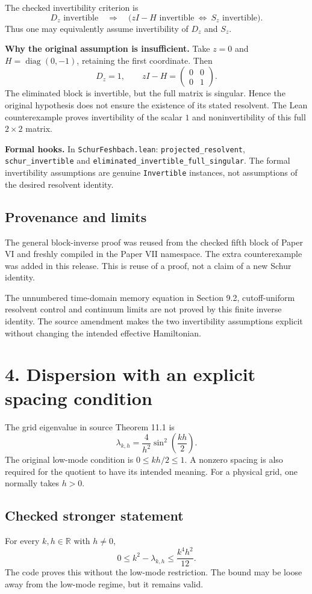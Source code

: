 \documentclass[11pt]{article}
\newcommand{\R}{\mathbb R}
\newcommand{\diag}{\operatorname{diag}}
\newcommand{\code}[1]{{\small\nolinkurl{#1}}}
\begin{document}
The checked invertibility criterion is
\[
D_z\text{ invertible}\quad\Longrightarrow\quad
\bigl(zI-H\text{ invertible}\ \Longleftrightarrow\ S_z\text{ invertible}\bigr).
\]
Thus one may equivalently assume invertibility of $D_z$ and $S_z$.

\textbf{Why the original assumption is insufficient.}
Take $z=0$ and $H=\diag(0,-1)$, retaining the first coordinate. Then
\[
D_z=1,\qquad zI-H=\begin{pmatrix}0&0\\0&1\end{pmatrix}.
\]
The eliminated block is invertible, but the full matrix is singular. Hence the original hypothesis does not ensure the existence of its stated resolvent. The Lean counterexample proves invertibility of the scalar $1$ and noninvertibility of this full $2\times2$ matrix.

\textbf{Formal hooks.} In \code{SchurFeshbach.lean}:
\code{projected_resolvent}, \code{schur_invertible} and
\code{eliminated_invertible_full_singular}.
The formal invertibility assumptions are genuine \code{Invertible} instances, not assumptions of the desired resolvent identity.

\subsection*{Provenance and limits}
The general block-inverse proof was reused from the checked fifth block of Paper VI and freshly compiled in the Paper VII namespace. The extra counterexample was added in this release. This is reuse of a proof, not a claim of a new Schur identity.

The unnumbered time-domain memory equation in Section 9.2, cutoff-uniform resolvent control and continuum limits are not proved by this finite inverse identity. The source amendment makes the two invertibility assumptions explicit without changing the intended effective Hamiltonian.

\clearpage
\section*{4. Dispersion with an explicit spacing condition}
The grid eigenvalue in source Theorem 11.1 is
\[
\lambda_{k,h}=\frac{4}{h^2}\sin^2\left(\frac{kh}{2}\right).
\]
The original low-mode condition is $0\le kh/2\le1$. A nonzero spacing is also required for the quotient to have its intended meaning. For a physical grid, one normally takes $h>0$.

\subsection*{Checked stronger statement}
For every $k,h\in\R$ with $h\ne0$,
\[
\boxed{0\le k^2-\lambda_{k,h}\le\frac{k^4h^2}{12}.}
\]
The code proves this without the low-mode restriction. The bound may be loose away from the low-mode regime, but it remains valid.
\end{document}
